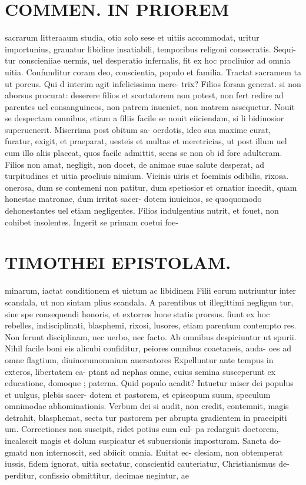 \documentclass{article}
\begin{document}
\begin{pages}
\section*{COMMEN. IN PRIOREM }
\marginpar{[ p.68 ]}\pstart sacrarum litteraaum studia, otio solo sese et uitiis accommodat, uritur importunius, grauatur libidine insatiabili, temporibus religoni consecratis. Sequi- tur conscieniiae uermis, uel desperatio infernalis, fit ex hoc procliuior ad omnia uitia. Confunditur coram deo, conscientia, populo et familia. Tractat sacramem ta ut porcus. Qui d interim agit infelicissima mere- trix? Filios forsan generat. si non aborsus procurat: deserere filios et scortatorem non potest, non fert redire ad parentes uel consanguineos, non patrem inueniet, non matrem assequetur. Nouit se despectam omnibus, etiam a filiis facile se nouit eiiciendam, si li bidinosior superuenerit. Miserrima post obitum sa- oerdotis, ideo sua maxime curat, furatur, exigit, et praeparat, uesteis et multas et meretricias, ut post illum uel cum illo aliis placeat, quos facile admittit, scens se non ob id fore adulteram. Filios non amat, negligit, non docet, de animae suae salute desperat, ad turpitudines et uitia procliuis nimium. Vicinis uiris et foeminis odibilis, rixosa. onerosa, dum se contemeni non patitur, dum spetiosior et ornatior incedit, quam honestae matronae, dum irritat sacer- dotem inuicinos, se quoquomodo dehonestantes uel etiam negligentes. Filios indulgentius nutrit, et fouet, non cohibet insolentes. Ingerit se primam coetui foe-  \pend
\section*{TIMOTHEI EPISTOLAM. }
\marginpar{[ p.69 ]}\pstart minarum, iactat conditionem et uictum ac libidinem Filii eorum nutriuntur inter scandala, ut non sintam plius scandala. A parentibus ut illegittimi negligun tur, sine spe consequendi honoris, et extorres hone statis prorsus. fiunt ex hoc rebelles, indisciplinati, blasphemi, rixosi, lusores, etiam parentum contempto res. Non ferunt disciplinam, nec uerbo, nec facto. Ab omnibus despiciuntur ut spurii. Nihil facile boni eis alicubi confiditur, peiores omnibus coaetaneis, auda- oes ad omne flagtium, diuinorumomnium auersatores Expelluntur ante tempus in exteros, libertatem ca- ptant ad nephas omne, cuius semina susceperunt ex educatione, domoque ; paterna. Quid populo acadit? Intuetur miser dei populus et uulgus, plebis sacer- dotem et pastorem, et episcopum suum, speculum omnimodae abhominationis. Verbum dei si audit, non credit, contemnit, magis detrahit, blasphemat, secta tur pastorem per abrupta gradientem in praecipiti um. Correctiones non suscipit, ridet potius cum cul- pa redarguit doctorem, incalescit magis et dolum suspicatur et subuersionis imposturam. Sancta do- gmatd non internoscit, sed abiicit omnia. Euitat ec- clesiam, non obtemperat iussis, fidem ignorat, uitia sectatur, conscientid cauteriatur, Christianismus de- perditur, confissio obmittitur, decimae negintur, ae  \pend

\end{pages}
\end{document}
